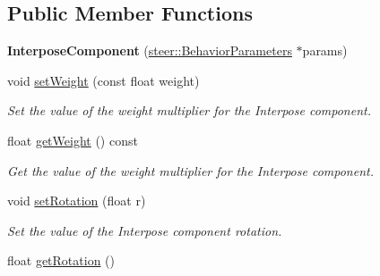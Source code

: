 \subsection*{Public Member Functions}
\begin{DoxyCompactItemize}
\item 
\hypertarget{classsteer_1_1_interpose_component_a98c2fe70659f855de3de0dd2da1c849b}{{\bfseries Interpose\-Component} (\hyperlink{structsteer_1_1_behavior_parameters}{steer\-::\-Behavior\-Parameters} $\ast$params)}\label{classsteer_1_1_interpose_component_a98c2fe70659f855de3de0dd2da1c849b}

\item 
void \hyperlink{classsteer_1_1_interpose_component_acb57d889e89e0b1f9bc5acb92b620a23}{set\-Weight} (const float weight)
\begin{DoxyCompactList}\small\item\em Set the value of the weight multiplier for the Interpose component. \end{DoxyCompactList}\item 
\hypertarget{classsteer_1_1_interpose_component_ad1920f951a1b37b6070ac39ffc6bf225}{float \hyperlink{classsteer_1_1_interpose_component_ad1920f951a1b37b6070ac39ffc6bf225}{get\-Weight} () const }\label{classsteer_1_1_interpose_component_ad1920f951a1b37b6070ac39ffc6bf225}

\begin{DoxyCompactList}\small\item\em Get the value of the weight multiplier for the Interpose component. \end{DoxyCompactList}\item 
\hypertarget{classsteer_1_1_interpose_component_a83249b4d48e4434e7bb341c0b1d768b2}{void \hyperlink{classsteer_1_1_interpose_component_a83249b4d48e4434e7bb341c0b1d768b2}{set\-Rotation} (float r)}\label{classsteer_1_1_interpose_component_a83249b4d48e4434e7bb341c0b1d768b2}

\begin{DoxyCompactList}\small\item\em Set the value of the Interpose component rotation. \end{DoxyCompactList}\item 
\hypertarget{classsteer_1_1_interpose_component_a87b3dbdba7c248e1926cf110daf3dd4e}{float \hyperlink{classsteer_1_1_interpose_component_a87b3dbdba7c248e1926cf110daf3dd4e}{get\-Rotation} ()}\label{classsteer_1_1_interpose_component_a87b3dbdba7c248e1926cf110daf3dd4e}


\end{DoxyCompactItemize}
